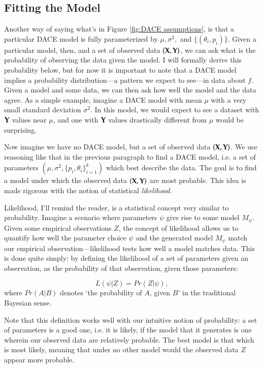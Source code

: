 \subsection{Fitting the Model}\label{sec:max_lik}
Another way of saying what's in Figure \ref{fig:DACE assumptions}, is that a particular DACE model is fully parameterized by $\mu, \sigma^2,$ and $\{(\theta_i,p_i)\}$. Given a particular model, then, and a set of observed data $(\mathbf{X},\mathbf{Y})$, we can ask what is the probability of observing the data given the model. I will formally derive this probability below, but for now it is important to note that a DACE model implies a probability distribution---a pattern we expect to see---in data about $f$. Given a model and some data, we can then ask how well the model and the data agree. As a simple example, imagine a DACE model with mean $\mu$ with a very small standard deviation $\sigma^2$. In this model, we would expect to see a dataset with $\mathbf{Y}$ values near $\mu$, and one with $\mathbf{Y}$ values drastically different from $\mu$ would be surprising. 

Now imagine we have no DACE model, but a set of observed data $(\mathbf{X},\mathbf{Y})$. We use reasoning like that in the previous paragraph to find a DACE model, i.e. a set of parameters $(\mu,\sigma^2,\{p_i,\theta_i\}_{i=1}^k)$ which best describe the data. The goal is to find a model under which the observed data $(\mathbf{X},\mathbf{Y})$ are most probable. This idea is made rigorous with the notion of statistical \emph{likelihood}.

Likelihood, I'll remind the reader, is a statistical concept very similar to probability. %
Imagine a scenario where parameters $\psi$ give rise to some model $M_\psi$. Given some empirical observations $Z$, the concept of likelihood allows us to quantify how well the parameter choice $\psi$ and the generated model $M_\psi$ match our empirical observation---likelihood tests how well a model matches data. This is done quite simply: by defining the likelihood of a set of parameters given an observation, as the probability of that observation, given those parameters:

\begin{equation} \label{eq:def_likelihood}
L(\psi|Z) = Pr(Z|\psi),
\end{equation}
where $Pr(A|B)$ denotes `the probability of $A$, given $B$' in the traditional Bayesian sense.

Note that this definition works well with our intuitive notion of probability: a set of parameters is a good one, i.e. it is likely, if the model that it generates is one wherein our observed data are relatively probable. The best model is that which is most likely, meaning that under no other model would the observed data $Z$ appear more probable.

